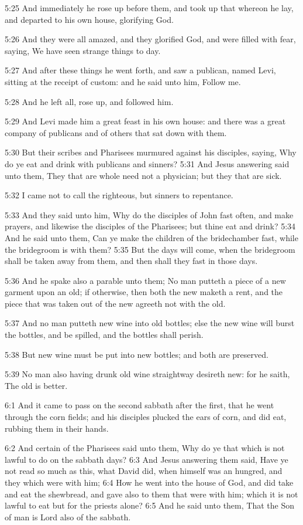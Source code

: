 5:25 And immediately he rose up before them, and took up that whereon
he lay, and departed to his own house, glorifying God.

5:26 And they were all amazed, and they glorified God, and were filled
with fear, saying, We have seen strange things to day.

5:27 And after these things he went forth, and saw a publican, named
Levi, sitting at the receipt of custom: and he said unto him, Follow
me.

5:28 And he left all, rose up, and followed him.

5:29 And Levi made him a great feast in his own house: and there was a
great company of publicans and of others that sat down with them.

5:30 But their scribes and Pharisees murmured against his disciples,
saying, Why do ye eat and drink with publicans and sinners?  5:31 And
Jesus answering said unto them, They that are whole need not a
physician; but they that are sick.

5:32 I came not to call the righteous, but sinners to repentance.

5:33 And they said unto him, Why do the disciples of John fast often,
and make prayers, and likewise the disciples of the Pharisees; but
thine eat and drink?  5:34 And he said unto them, Can ye make the
children of the bridechamber fast, while the bridegroom is with them?
5:35 But the days will come, when the bridegroom shall be taken away
from them, and then shall they fast in those days.

5:36 And he spake also a parable unto them; No man putteth a piece of
a new garment upon an old; if otherwise, then both the new maketh a
rent, and the piece that was taken out of the new agreeth not with the
old.

5:37 And no man putteth new wine into old bottles; else the new wine
will burst the bottles, and be spilled, and the bottles shall perish.

5:38 But new wine must be put into new bottles; and both are
preserved.

5:39 No man also having drunk old wine straightway desireth new: for
he saith, The old is better.

6:1 And it came to pass on the second sabbath after the first, that he
went through the corn fields; and his disciples plucked the ears of
corn, and did eat, rubbing them in their hands.

6:2 And certain of the Pharisees said unto them, Why do ye that which
is not lawful to do on the sabbath days?  6:3 And Jesus answering them
said, Have ye not read so much as this, what David did, when himself
was an hungred, and they which were with him; 6:4 How he went into the
house of God, and did take and eat the shewbread, and gave also to
them that were with him; which it is not lawful to eat but for the
priests alone?  6:5 And he said unto them, That the Son of man is Lord
also of the sabbath.

